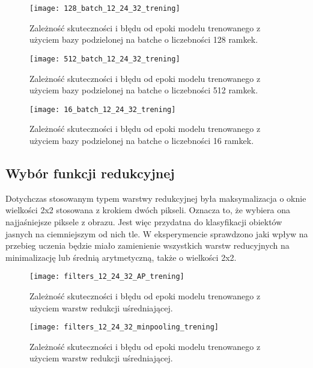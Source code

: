 {\begin{figure}[H]
	\centering
	\centering
		\texttt{[image: 128\_batch\_12\_24\_32\_trening]}	
	\caption{Zależność skuteczności i błędu od epoki modelu trenowanego z użyciem bazy podzielonej na batche o liczebności 128 ramkek.}	\label{fig:128_batch_12_24_32_trening}
\end{figure}

\begin{figure}[H]
	\centering
	\centering
		\texttt{[image: 512\_batch\_12\_24\_32\_trening]}	
	\caption{Zależność skuteczności i błędu od epoki modelu trenowanego z użyciem bazy podzielonej na batche o liczebności 512 ramkek.}	\label{fig:512_batch_12_24_32_trening}
\end{figure}

\begin{figure}[H]
	\centering
	\centering
		\texttt{[image: 16\_batch\_12\_24\_32\_trening]}	
	\caption{Zależność skuteczności i błędu od epoki modelu trenowanego z użyciem bazy podzielonej na batche o liczebności 16 ramkek.}	\label{fig:16_batch_12_24_32_trening}
\end{figure}
}

\subsection{Wybór funkcji redukcyjnej}

Dotychczas stosowanym typem warstwy redukcyjnej była maksymalizacja o oknie wielkości 2x2 stosowana z krokiem dwóch pikseli. Oznacza to, że wybiera ona najjaśniejsze piksele z obrazu. Jest więc przydatna do klasyfikacji obiektów jasnych na ciemniejszym od nich tle. W eksperymencie sprawdzono jaki wpływ na przebieg uczenia będzie miało zamienienie wszystkich warstw reducyjnych na minimalizację lub średnią arytmetyczną, także o wielkości 2x2. 

\begin{figure}[H]
	\centering
	\centering
		\texttt{[image: filters\_12\_24\_32\_AP\_trening]}	
	\caption{Zależność skuteczności i błędu od epoki modelu trenowanego z użyciem warstw redukcji uśredniającej.}	\label{fig:filters_12_24_32_AP_trening}
\end{figure}

\begin{figure}[H]
	\centering
	\centering
		\texttt{[image: filters\_12\_24\_32\_minpooling\_trening]}	
	\caption{Zależność skuteczności i błędu od epoki modelu trenowanego z użyciem warstw redukcji uśredniającej.}	\label{fig:filters_12_24_32_minpooling_trening}
\end{figure}

